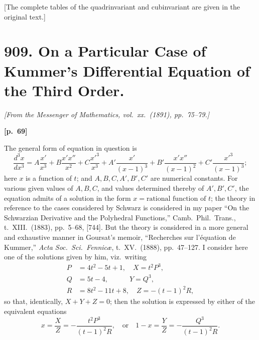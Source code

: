 \documentclass[11pt,a4paper]{article}
\theoremstyle{plain}
\begin{document}
[The complete tables of the quadrinvariant and cubinvariant are given in the original text.]

\newpage

\section*{909. On a Particular Case of Kummer's Differential Equation of the Third Order.}

\noindent\textit{[From the Messenger of Mathematics, vol.\ xx.\ (1891), pp.\ 75--79.]}

\vspace{0.5em}
\noindent\textbf{[p.\ 69]}

The general form of equation in question is
$$
\frac{d^3 x}{dx^3} = A \frac{x'}{x^3} + B \frac{x' x''}{x^2} + C \frac{x'^3}{x^3} + A' \frac{x'}{(x - 1)^3} + B' \frac{x' x''}{(x - 1)^2} + C' \frac{x'^3}{(x - 1)^3};
$$
here $x$ is a function of $t$; and $A, B, C, A', B', C'$ are numerical constants. For various given values of $A, B, C$, and values determined thereby of $A', B', C'$, the equation admits of a solution in the form $x = \text{rational function of } t$; the theory in reference to the cases considered by Schwarz is considered in my paper ``On the Schwarzian Derivative and the Polyhedral Functions,'' Camb.\ Phil.\ Trans., t.\ XIII.\ (1883), pp.\ 5--68, [744]. But the theory is considered in a more general and exhaustive manner in Goursat's memoir, ``Recherches sur l'\'equation de Kummer,'' \textit{Acta Soc.\ Sci.\ Fennic\ae}, t.\ XV.\ (1888), pp.\ 47--127. I consider here one of the solutions given by him, viz.\ writing
\begin{align*}
P &= 4t^2 - 5t + 1, \quad X = t^2 P^3, \\
Q &= 5t - 4, \qquad\quad Y = Q^3, \\
R &= 8t^2 - 11t + 8, \quad Z = -(t - 1)^2 R,
\end{align*}
so that, identically, $X + Y + Z = 0$; then the solution is expressed by either of the equivalent equations
$$
x = \frac{X}{Z} = -\frac{t^2 P^3}{(t - 1)^2 R}, \quad \text{or} \quad 1 - x = \frac{Y}{Z} = -\frac{Q^3}{(t - 1)^2 R}.
$$
\end{document}
